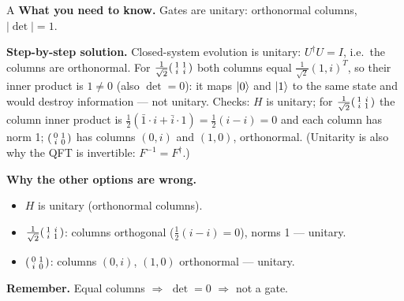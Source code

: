 \documentclass[11pt,a4paper]{article}
\newcommand{\qsep}{\par\vspace{2pt}{\color{black!15}\hrule}\vspace{4pt}}
\begin{document}
\begin{solbox}{A}
\textbf{\color{brand}What you need to know.} Gates are unitary: orthonormal columns, $|\det| = 1$.

\textbf{\color{brand}Step-by-step solution.} Closed-system evolution is unitary: $U^\dagger U = I$, i.e.\ the columns are orthonormal.
For $\frac{1}{\sqrt2}\begin{psmallmatrix}1&1\\ i&i\end{psmallmatrix}$ both columns equal $\frac{1}{\sqrt2}(1, i)^T$, so their inner
product is $1 \neq 0$ (also $\det = 0$): it maps $\ket0$ and $\ket1$ to the same state and would destroy information --- not unitary.
Checks: $H$ is unitary; for $\frac{1}{\sqrt2}\begin{psmallmatrix}1&i\\ i&1\end{psmallmatrix}$ the column inner product is
$\frac12(\bar1\cdot i + \bar i\cdot 1) = \frac12(i - i) = 0$ and each column has norm 1; $\begin{psmallmatrix}0&1\\ i&0\end{psmallmatrix}$ has
columns $(0, i)$ and $(1, 0)$, orthonormal. (Unitarity is also why the QFT is invertible: $F^{-1} = F^\dagger$.)

\textbf{\color{brand}Why the other options are wrong.}
\begin{itemize}[leftmargin=2.4em, itemsep=1pt, topsep=2pt]
\item[\textbf{(B)}] $H$ is unitary (orthonormal columns).
\item[\textbf{(C)}] $\frac{1}{\sqrt2}\begin{psmallmatrix}1&i\\i&1\end{psmallmatrix}$: columns orthogonal ($\frac12(i - i) = 0$), norms 1 --- unitary.
\item[\textbf{(D)}] $\begin{psmallmatrix}0&1\\i&0\end{psmallmatrix}$: columns $(0,i)$, $(1,0)$ orthonormal --- unitary.
\end{itemize}
\textbf{\color{brand}Remember.} Equal columns $\Rightarrow$ $\det = 0$ $\Rightarrow$ not a gate.
\end{solbox}
\qsep
\end{document}
